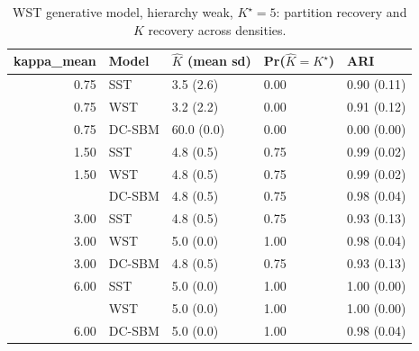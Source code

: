 \begin{table}
\centering
\caption{WST generative model, hierarchy weak, $K^\star=5$: partition recovery and $K$ recovery across densities.}
\centering
\begin{tabular}[t]{rllll}
\toprule
kappa_mean & Model & $\hat K$ (mean sd) & Pr($\hat K = K^\star$) & ARI\\
\midrule
0.75 & SST & 3.5 (2.6) & 0.00 & 0.90 (0.11)\\
0.75 & WST & 3.2 (2.2) & 0.00 & 0.91 (0.12)\\
0.75 & DC-SBM & 60.0 (0.0) & 0.00 & 0.00 (0.00)\\
1.50 & SST & 4.8 (0.5) & 0.75 & 0.99 (0.02)\\
1.50 & WST & 4.8 (0.5) & 0.75 & 0.99 (0.02)\\
\addlinespace
1.50 & DC-SBM & 4.8 (0.5) & 0.75 & 0.98 (0.04)\\
3.00 & SST & 4.8 (0.5) & 0.75 & 0.93 (0.13)\\
3.00 & WST & 5.0 (0.0) & 1.00 & 0.98 (0.04)\\
3.00 & DC-SBM & 4.8 (0.5) & 0.75 & 0.93 (0.13)\\
6.00 & SST & 5.0 (0.0) & 1.00 & 1.00 (0.00)\\
\addlinespace
6.00 & WST & 5.0 (0.0) & 1.00 & 1.00 (0.00)\\
6.00 & DC-SBM & 5.0 (0.0) & 1.00 & 0.98 (0.04)\\
\bottomrule
\end{tabular}
\end{table}
